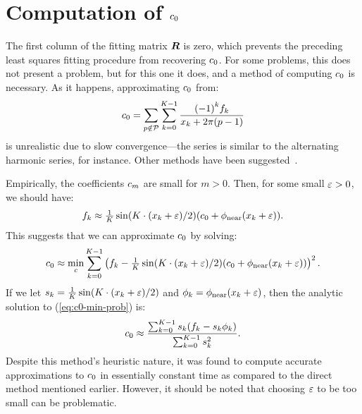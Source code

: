 \section{Computation of ${c}_{0}$}

The first column of the fitting matrix $\boldsymbol{R}$ is zero, which prevents
the preceding least squares fitting procedure from recovering
${c}_{0}$. For some problems, this does not present a problem,
but for this one it does, and a method of computing ${c}_{0}$
is necessary. As it happens, approximating ${c}_{0}$ from:
\begin{align}
  \label{eq:c0-direct}
  {c}_{0} = \sum_{p\notin\mathcal{P}}\sum_{k=0}^{K-1} \frac{{(-1)}^k {f}_{k}}{{x}_{k} + 2\pi(p - 1)}
\end{align}
is unrealistic due to slow convergence---the series is similar to the
alternating harmonic series, for instance. Other methods have been
suggested~\cite{periodic-sums}.

Empirically, the coefficients ${c}_{m}$ are small for $m >
0$. Then, for some small $\varepsilon > 0$, we should have:
\begin{align}
  \label{eq:g-approx-for-c0}
  {f}_{k} \approx \tfrac{1}{K} \sin(K{} \cdot ({x}_{k} + \varepsilon)/2) ({c}_{0} + \phi_{\operatorname{near}}({x}_{k} + \varepsilon)).
\end{align}
This suggests that we can approximate ${c}_{0}$ by solving:
\begin{align}
  \label{eq:c0-min-prob}
  {c}_{0} \approx \min_c \sum_{k=0}^{K-1} \left({f}_{k} - \tfrac{1}{K} \sin(K{} \cdot ({x}_{k} + \varepsilon)/2) ({c}_{0} + \phi_{\operatorname{near}}({x}_{k} + \varepsilon))\right)^2.
\end{align}
If we let
$s_k = \tfrac{1}{K{}} \sin(K{} \cdot
({x}_{k} + \varepsilon)/2)$ and
$\phi_k = \phi_{\operatorname{near}}({x}_{k} + \varepsilon)$, then the
analytic solution to (\ref{eq:c0-min-prob}) is:
\begin{align}
  \label{eq:c0-minimizer}
  {c}_{0} \approx \frac{\sum_{k=0}^{K-1} s_k({f}_{k} - s_k\phi_k)}{\sum_{k=0}^{K-1} s_k^2}.
\end{align}
Despite this method's heuristic nature, it was found to compute
accurate approximations to ${c}_{0}$ in essentially constant
time as compared to the direct method mentioned earlier. However, it
should be noted that choosing $\varepsilon$ to be too small can be
problematic.

